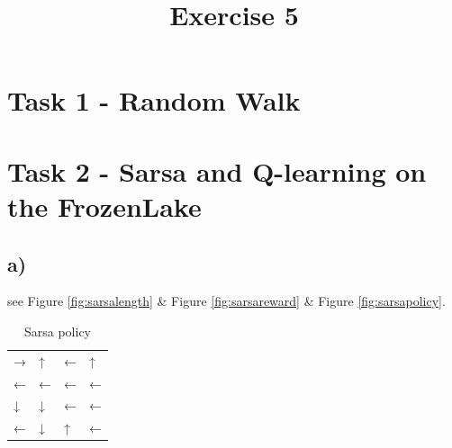 \documentclass[a4paper]{article}
\date{}
\author{}
\title{\textbf{Exercise 5}}
\begin{document}
\maketitle 
\thispagestyle{fancy}

\section*{Task 1 - Random Walk}


\section*{Task 2 - Sarsa and Q-learning on the FrozenLake}

\subsection*{a)}
see Figure \ref{fig:sarsalength} \& Figure \ref{fig:sarsareward} \& Figure \ref{fig:sarsapolicy}.

\begin{table}[!ht]
	\centering
	\begin{tabular}{llll}
		→ & ↑ & ← & ↑ \\
		← & ← & ← & ← \\
		↓ & ↓ & ← & ← \\
		← & ↓ & ↑ & ←
	\end{tabular}
	\caption{Sarsa policy}
\end{table}
\end{document}
